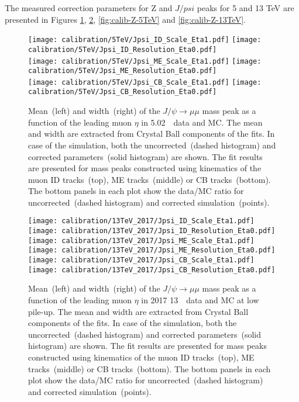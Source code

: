 	The measured correction parameters for Z and $J/psi$ peaks for 5 and 13 TeV are presented in Figures \ref{fig:calib-Jpsi-5TeV}, \ref{fig:calib-Jpsi-13TeV}, \ref{fig:calib-Z-5TeV} and \ref{fig:calib-Z-13TeV}.
	
	\begin{figure}[htb!]
		\begin{center}
			\texttt{[image: calibration/5TeV/Jpsi\_ID\_Scale\_Eta1.pdf]}
			\texttt{[image: calibration/5TeV/Jpsi\_ID\_Resolution\_Eta0.pdf]}\\
			\texttt{[image: calibration/5TeV/Jpsi\_ME\_Scale\_Eta1.pdf]}
			\texttt{[image: calibration/5TeV/Jpsi\_ME\_Resolution\_Eta0.pdf]}\\
			\texttt{[image: calibration/5TeV/Jpsi\_CB\_Scale\_Eta1.pdf]}
			\texttt{[image: calibration/5TeV/Jpsi\_CB\_Resolution\_Eta0.pdf]}
			\caption{Mean~(left) and width~(right) of the $J/\psi \to \mu\mu$ mass peak as a function of the leading muon $\eta$ in 5.02~\TeV\ data and MC. The mean and width are extracted from Crystal Ball components of the fits. In case of the simulation, both the uncorrected~(dashed histogram) and corrected parameters~(solid histogram) are shown. The fit results are presented for mass peaks constructed using kinematics of the muon ID tracks~(top), ME tracks~(middle) or CB tracks~(bottom). The bottom panels in each plot show the data/MC ratio for uncorrected~(dashed histogram) and corrected simulation~(points).}
			\label{fig:calib-Jpsi-5TeV}
		\end{center}
	\end{figure}
	
	\begin{figure}[htb!]
		\begin{center}
			\texttt{[image: calibration/13TeV\_2017/Jpsi\_ID\_Scale\_Eta1.pdf]}
			\texttt{[image: calibration/13TeV\_2017/Jpsi\_ID\_Resolution\_Eta0.pdf]}\\
			\texttt{[image: calibration/13TeV\_2017/Jpsi\_ME\_Scale\_Eta1.pdf]}
			\texttt{[image: calibration/13TeV\_2017/Jpsi\_ME\_Resolution\_Eta0.pdf]}\\
			\texttt{[image: calibration/13TeV\_2017/Jpsi\_CB\_Scale\_Eta1.pdf]}
			\texttt{[image: calibration/13TeV\_2017/Jpsi\_CB\_Resolution\_Eta0.pdf]}
			\caption{Mean~(left) and width~(right) of the $J/\psi \to \mu\mu$ mass peak as a function of the leading muon $\eta$ in 2017 13~\TeV\ data and MC at low pile-up. The mean and width are extracted from Crystal Ball components of the fits. In case of the simulation, both the uncorrected~(dashed histogram) and corrected parameters~(solid histogram) are shown. The fit results are presented for mass peaks constructed using kinematics of the muon ID tracks~(top), ME tracks~(middle) or CB tracks~(bottom). The bottom panels in each plot show the data/MC ratio for uncorrected~(dashed histogram) and corrected simulation~(points).}
			\label{fig:calib-Jpsi-13TeV}
		\end{center}
	\end{figure}

